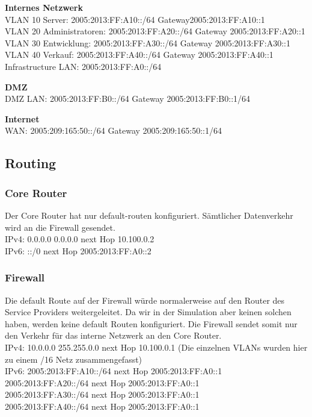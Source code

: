 \documentclass[11pt,a4paper,parskip=half]{scrartcl}
\begin{document}
\textbf{Internes Netzwerk}\\
VLAN 10 Server: 2005:2013:FF:A10::/64 Gateway2005:2013:FF:A10::1\\
VLAN 20 Administratoren: 2005:2013:FF:A20::/64 Gateway 2005:2013:FF:A20::1\\
VLAN 30 Entwicklung: 2005:2013:FF:A30::/64 Gateway 2005:2013:FF:A30::1\\
VLAN 40 Verkauf: 2005:2013:FF:A40::/64 Gateway 2005:2013:FF:A40::1\\
Infrastructure LAN: 2005:2013:FF:A0::/64

\textbf{DMZ}\\
DMZ LAN: 2005:2013:FF:B0::/64 Gateway 2005:2013:FF:B0::1/64

\textbf{Internet}\\
WAN: 2005:209:165:50::/64 Gateway 2005:209:165:50::1/64

\subsection{Routing}
\subsubsection{Core Router}
Der Core Router hat nur default-routen konfiguriert. Sämtlicher Datenverkehr wird an die Firewall gesendet.\\
IPv4: 0.0.0.0 0.0.0.0 next Hop 10.100.0.2\\
IPv6: ::/0 next Hop 2005:2013:FF:A0::2

\subsubsection{Firewall}
Die default Route auf der Firewall würde normalerweise auf den Router des Service Providers weitergeleitet. Da wir in der Simulation aber keinen solchen haben, werden keine default Routen konfiguriert. Die Firewall sendet somit nur den Verkehr für das interne Netzwerk an den Core Router.\\
IPv4: 10.0.0.0 255.255.0.0 next Hop 10.100.0.1 (Die einzelnen VLANs wurden hier zu einem /16 Netz zusammengefasst)\\
IPv6: 2005:2013:FF:A10::/64 next Hop 2005:2013:FF:A0::1\\
2005:2013:FF:A20::/64 next Hop 2005:2013:FF:A0::1\\
2005:2013:FF:A30::/64 next Hop 2005:2013:FF:A0::1\\
2005:2013:FF:A40::/64 next Hop 2005:2013:FF:A0::1
\end{document}
